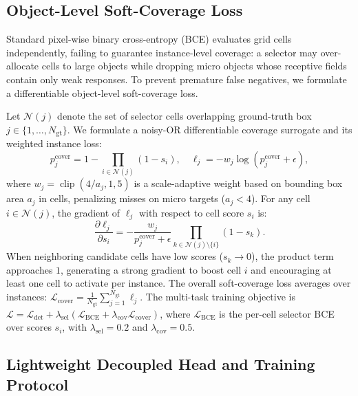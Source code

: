 \subsection{Object-Level Soft-Coverage Loss}
\label{ssec:coverage}

Standard pixel-wise binary cross-entropy (BCE) evaluates grid cells independently, failing to guarantee instance-level coverage: a selector may over-allocate cells to large objects while dropping micro objects whose receptive fields contain only weak responses. To prevent premature false negatives, we formulate a differentiable object-level soft-coverage loss.

Let $\mathcal{N}(j)$ denote the set of selector cells overlapping ground-truth box $j \in \{1, \dots, N_{\mathrm{gt}}\}$. We formulate a noisy-OR differentiable coverage surrogate and its weighted instance loss:
\begin{equation}
p_j^{\mathrm{cover}} = 1 - \prod_{i \in \mathcal{N}(j)} (1 - s_i), \quad \ell_j = -w_j \log\left( p_j^{\mathrm{cover}} + \epsilon \right),
\label{eq:cover_loss}
\end{equation}
where $w_j = \operatorname{clip}(4/a_j, 1, 5)$ is a scale-adaptive weight based on bounding box area $a_j$ in cells, penalizing misses on micro targets ($a_j < 4$). For any cell $i \in \mathcal{N}(j)$, the gradient of $\ell_j$ with respect to cell score $s_i$ is:
\begin{equation}
\frac{\partial \ell_j}{\partial s_i} = -\frac{w_j}{p_j^{\mathrm{cover}} + \epsilon} \prod_{k \in \mathcal{N}(j) \setminus \{i\}} (1 - s_k).
\label{eq:cover_grad}
\end{equation}
When neighboring candidate cells have low scores ($s_k \to 0$), the product term approaches $1$, generating a strong gradient to boost cell $i$ and encouraging at least one cell to activate per instance. The overall soft-coverage loss averages over instances: $\mathcal{L}_{\mathrm{cover}} = \frac{1}{N_{\mathrm{gt}}} \sum_{j=1}^{N_{\mathrm{gt}}} \ell_j$. The multi-task training objective is $\mathcal{L} = \mathcal{L}_{\mathrm{det}} + \lambda_{\mathrm{sel}}(\mathcal{L}_{\mathrm{BCE}} + \lambda_{\mathrm{cov}}\mathcal{L}_{\mathrm{cover}})$, where $\mathcal{L}_{\mathrm{BCE}}$ is the per-cell selector BCE over scores $s_i$, with $\lambda_{\mathrm{sel}}=0.2$ and $\lambda_{\mathrm{cov}}=0.5$.

\subsection{Lightweight Decoupled Head and Training Protocol}
\label{ssec:head}

